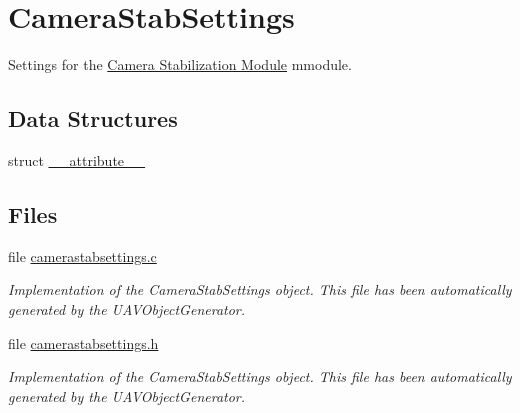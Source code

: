 \hypertarget{group___camera_stab_settings}{\section{\-Camera\-Stab\-Settings}
\label{group___camera_stab_settings}
}


\-Settings for the \hyperlink{group___camera_stab}{\-Camera \-Stabilization \-Module} mmodule.  


\subsection*{\-Data \-Structures}
\begin{DoxyCompactItemize}
\item 
struct \hyperlink{struct____attribute____}{\-\_\-\-\_\-attribute\-\_\-\-\_\-}
\end{DoxyCompactItemize}
\subsection*{\-Files}
\begin{DoxyCompactItemize}
\item 
file \hyperlink{camerastabsettings_8c}{camerastabsettings.\-c}
\begin{DoxyCompactList}\small\item\em \-Implementation of the \-Camera\-Stab\-Settings object. \-This file has been automatically generated by the \-U\-A\-V\-Object\-Generator. \end{DoxyCompactList}\item 
file \hyperlink{camerastabsettings_8h}{camerastabsettings.\-h}
\begin{DoxyCompactList}\small\item\em \-Implementation of the \-Camera\-Stab\-Settings object. \-This file has been automatically generated by the \-U\-A\-V\-Object\-Generator. \end{DoxyCompactList}\end{DoxyCompactItemize}

